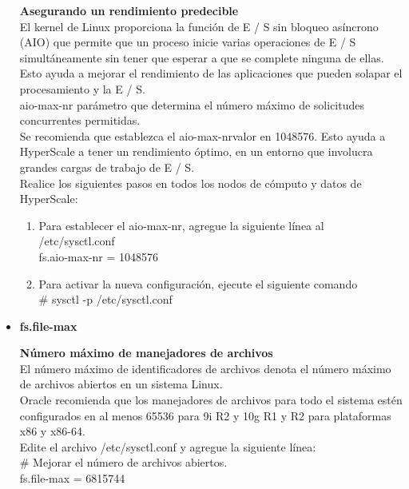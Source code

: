 \begin{itemize}
\begin{flushleft}
\textbf{Asegurando un rendimiento predecible}\\
El kernel de Linux proporciona la función de E / S sin bloqueo asíncrono (AIO) que permite que un proceso inicie varias operaciones de E / S simultáneamente sin tener que esperar a que se complete ninguna de ellas. Esto ayuda a mejorar el rendimiento de las aplicaciones que pueden solapar el procesamiento y la E / S.\\
\vspace{5mm} 
aio-max-nr parámetro que determina el número máximo de solicitudes concurrentes permitidas.\\
\vspace{5mm}
Se recomienda que establezca el aio-max-nrvalor en 1048576. Esto ayuda a HyperScale a tener un rendimiento óptimo, en un entorno que involucra grandes cargas de trabajo de E / S.\\
\vspace{5mm}
Realice los siguientes pasos en todos los nodos de cómputo y datos de HyperScale:
\begin{enumerate}
\item Para establecer el aio-max-nr, agregue la siguiente línea al /etc/sysctl.conf\\
fs.aio-max-nr = 1048576
\item Para activar la nueva configuración, ejecute el siguiente comando\\
\# sysctl -p /etc/sysctl.conf
\end{enumerate}
\end{flushleft}


	\item \textbf{fs.file-max}

\begin{flushleft}
\textbf{Número máximo de manejadores de archivos}\\
El número máximo de identificadores de archivos denota el número máximo de archivos abiertos en un sistema Linux.\\
\vspace{5mm}
Oracle recomienda que los manejadores de archivos para todo el sistema estén configurados en al menos 65536 para 9i R2 y 10g R1 y R2 para plataformas x86 y x86-64.\\
\vspace{5mm}
Edite el archivo /etc/sysctl.conf y agregue la siguiente línea:\\
\# Mejorar el número de archivos abiertos.\\
fs.file-max = 6815744\\
\end{flushleft}



\end{itemize}
